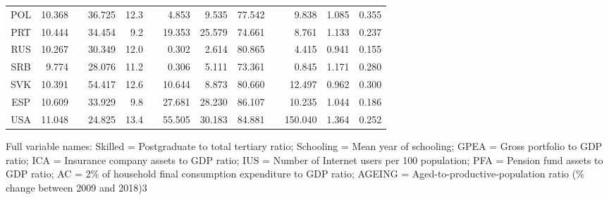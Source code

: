 {\begin{tabular}{crrrrrrrrrrrr}
POL   & 10.368 &       & 36.725 & 12.3  &       & 4.853 & 9.535 & 77.542 &       & 9.838 & 1.085 & 0.355 \\
PRT   & 10.444 &       & 34.454 & 9.2   &       & 19.353 & 25.579 & 74.661 &       & 8.761 & 1.133 & 0.237 \\
RUS   & 10.267 &       & 30.349 & 12.0    &       & 0.302 & 2.614 & 80.865 &       & 4.415 & 0.941 & 0.155 \\
SRB   & 9.774 &       & 28.076 & 11.2  &       & 0.306 & 5.111 & 73.361 &       & 0.845 & 1.171 & 0.280 \\
SVK   & 10.391 &       & 54.417 & 12.6  &       & 10.644 & 8.873 & 80.660 &       & 12.497 & 0.962 & 0.300 \\
ESP   & 10.609 &       & 33.929 & 9.8   &       & 27.681 & 28.230 & 86.107 &       & 10.235 & 1.044 & 0.186 \\
USA   & 11.048 &       & 24.825 & 13.4  &       & 55.505 & 30.183 & 84.881 &       & 150.040 & 1.364 & 0.252 \\
    \bottomrule
    \end{tabular}
}{Full variable names: Skilled = Postgraduate to total tertiary ratio; Schooling = Mean year of schooling; GPEA = Gross portfolio to GDP ratio; ICA = Insurance company assets to GDP ratio; IUS = Number of Internet users per 100 population; PFA = Pension fund assets to GDP ratio; AC = 2\% of household final consumption expenditure to GDP ratio; AGEING = Aged-to-productive-population ratio (\% change between 2009 and 2018)}{3}
